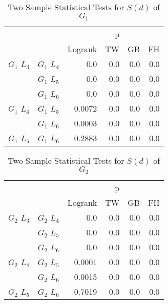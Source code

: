       
  \begin{table}
        \centering
        \begin{tabular}{llrrrr}
          \toprule
                       &             &         &  p &    &     \\
          \cmidrule{3-6}
                       &             & Logrank & TW & GB & FH  \\
          \midrule
          $G_1$ $L_3$  & $G_1$ $L_4$  &  0.0 &  0.0 &  0.0 &  0.0     \\
                       & $G_1$ $L_5$  & 0.0 & 0.0 & 0.0 & 0.0    \\
                       & $G_1$ $L_6$  & 0.0 & 0.0 & 0.0 & 0.0      \\
          $G_1$ $L_4$  & $G_1$ $L_5$  & 0.0072 & 0.0 & 0.0 & 0.0      \\
                       & $G_1$ $L_6$  & 0.0003 & 0.0 & 0.0 & 0.0       \\
          $G_1$ $L_5$   & $G_1$ $L_6$ & 0.2883 &  0.0 & 0.0 & 0.0      \\
          \bottomrule
        \end{tabular}
        \label{tab:g1_ingroup_tests_disp}
        \caption{Two Sample Statistical Tests for $S(d)$ of $G_1$}
      \end{table}


      \begin{table}
        \centering
        \begin{tabular}{llrrrr}
          \toprule
                       &             &         &  p &    &     \\
          \cmidrule{3-6}
                       &             & Logrank & TW & GB & FH  \\
          \midrule
          $G_2$ $L_3$  & $G_2$ $L_4$  &  0.0 &  0.0 &  0.0 &  0.0     \\
                       & $G_2$ $L_5$  & 0.0 & 0.0 & 0.0 & 0.0    \\
                       & $G_2$ $L_6$  & 0.0 & 0.0 & 0.0 & 0.0      \\
          $G_2$ $L_4$  & $G_2$ $L_5$  & 0.0001 & 0.0 & 0.0 & 0.0      \\
                       & $G_2$ $L_6$  & 0.0015 & 0.0 & 0.0 & 0.0       \\
          $G_2$ $L_5$   & $G_2$ $L_6$ & 0.7019 &  0.0 & 0.0 & 0.0      \\
          \bottomrule
        \end{tabular}
        \label{tab:g2_ingroup_tests_disp}
        \caption{Two Sample Statistical Tests for $S(d)$ of $G_2$}
      \end{table}

      








